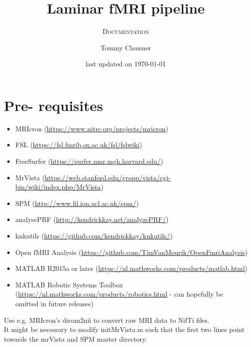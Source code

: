 \documentclass[12pt,a4paper]{scrartcl}
\title{Laminar fMRI pipeline}
\author{Tommy Clausner}
\subtitle{\textsc{Documentation}}
\date{\small{last updated on \today}}
\begin{document}
\begin{titlepage}
\clearpage\maketitle
\thispagestyle{empty}
\end{titlepage}
\tableofcontents
\newpage
\listoffigures
\newpage
\listoftables
\newpage
\section{Pre- requisites}
\begin{itemize}
\item MRIcron (\href{https://www.nitrc.org/projects/mricron}{https://www.nitrc.org/projects/mricron})
\item FSL (\href{https://fsl.fmrib.ox.ac.uk/fsl/fslwiki}{https://fsl.fmrib.ox.ac.uk/fsl/fslwiki})
\item FreeSurfer (\href{https://surfer.nmr.mgh.harvard.edu/}{https://surfer.nmr.mgh.harvard.edu/})
\item MrVista (\href{https://web.stanford.edu/group/vista/cgi-bin/wiki/index.php/MrVista}{https://web.stanford.edu/group/vista/cgi-bin/wiki/index.php/MrVista})
\item SPM (\href{http://www.fil.ion.ucl.ac.uk/spm/}{http://www.fil.ion.ucl.ac.uk/spm/})
\item analysePRF (\href{http://kendrickkay.net/analyzePRF/}{http://kendrickkay.net/analyzePRF/})
\item knkutils (\href {https://github.com/kendrickkay/knkutils/}{https://github.com/kendrickkay/knkutils/})
\item Open fMRI Analysis (\href{https://github.com/TimVanMourik/OpenFmriAnalysis}{https://github.com/TimVanMourik/OpenFmriAnalysis})
\item MATLAB R2015a or later (\href{https://nl.mathworks.com/products/matlab.html}{https://nl.mathworks.com/products/matlab.html})
\item MATLAB Robotic Systems Toolbox (\href{https://nl.mathworks.com/products/robotics.html}{https://nl.mathworks.com/products/robotics.html} - can hopefully be omitted in future releases)
\end{itemize}

Use e.g. MRIcron's dicom2nii to convert raw MRI data to NifTi files.\\

It might be necessary to modify initMrVista.m such that the first two lines point towards the mrVista and SPM master directory.
\end{document}
